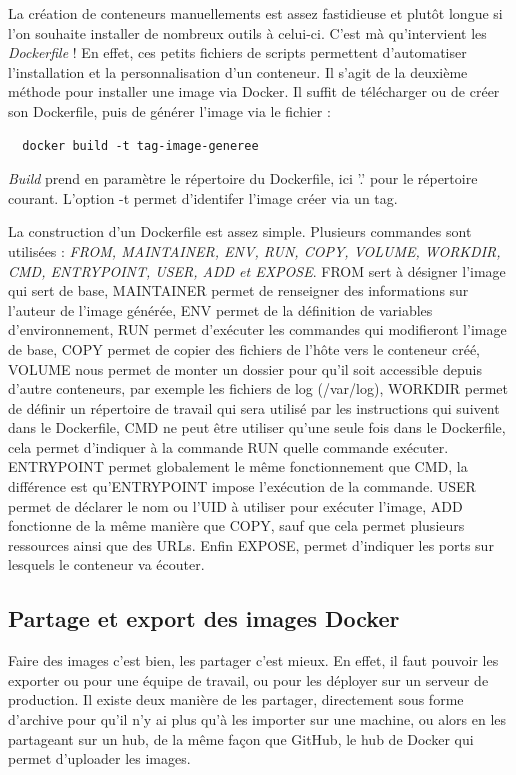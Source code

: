 \documentclass[12pt,a4paper]{article}
\begin{document}
La création de conteneurs manuellements est assez fastidieuse et plutôt longue si l'on souhaite installer de nombreux outils à celui-ci. C'est mà qu'intervient les \textit{Dockerfile} ! En effet, ces petits fichiers de scripts permettent d'automatiser l'installation et la personnalisation d'un conteneur. Il s'agit de la deuxième méthode pour installer une image via Docker. Il suffit de télécharger ou de créer son Dockerfile, puis de générer l'image via le fichier :
\begin{lstlisting}
  docker build -t tag-image-generee
\end{lstlisting}
\textit{Build} prend en paramètre le répertoire du Dockerfile, ici '.' pour le répertoire courant. L'option -t permet d'identifer l'image créer via un tag.

La construction d'un Dockerfile est assez simple. Plusieurs commandes sont utilisées : \textit{FROM, MAINTAINER, ENV, RUN, COPY, VOLUME, WORKDIR, CMD, ENTRYPOINT, USER, ADD et EXPOSE}. FROM sert à désigner l'image qui sert de base, MAINTAINER permet de renseigner des informations sur l'auteur de l'image générée, ENV permet de la définition de variables d'environnement, RUN permet d'exécuter les commandes qui modifieront l'image de base, COPY permet de copier des fichiers de l'hôte vers le conteneur créé, VOLUME nous permet de monter un dossier pour qu'il soit accessible depuis d'autre conteneurs, par exemple les fichiers de log (/var/log), WORKDIR permet de définir un répertoire de travail qui sera utilisé par les instructions qui suivent dans le Dockerfile, CMD ne peut être utiliser qu'une seule fois dans le Dockerfile, cela permet d'indiquer à la commande RUN quelle commande exécuter. ENTRYPOINT permet globalement le même fonctionnement que CMD, la différence est qu'ENTRYPOINT impose l'exécution de la commande. USER permet de déclarer le nom ou l'UID à utiliser pour exécuter l'image, ADD fonctionne de la même manière que COPY, sauf que cela permet plusieurs ressources ainsi que des URLs. Enfin EXPOSE, permet d'indiquer les ports sur lesquels le conteneur va écouter. 

\subsection{Partage et export des images Docker}

Faire des images c'est bien, les partager c'est mieux. En effet, il faut pouvoir les exporter ou pour une équipe de travail, ou pour les déployer sur un serveur de production. Il existe deux manière de les partager, directement sous forme d'archive pour qu'il n'y ai plus qu'à les importer sur une machine, ou alors en les partageant sur un hub, de la même façon que GitHub, le hub de Docker qui permet d'uploader les images.
\end{document}

